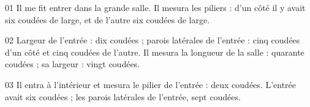 01 Il me fit entrer dans la grande salle. Il mesura les piliers : d’un côté il y avait six coudées de large, et de l’autre six coudées de large.

02 Largeur de l’entrée : dix coudées ; parois latérales de l’entrée : cinq coudées d’un côté et cinq coudées de l’autre. Il mesura la longueur de la salle : quarante coudées ; sa largeur : vingt coudées.

03 Il entra à l’intérieur et mesura le pilier de l’entrée : deux coudées. L’entrée avait six coudées ; les parois latérales de l’entrée, sept coudées.

